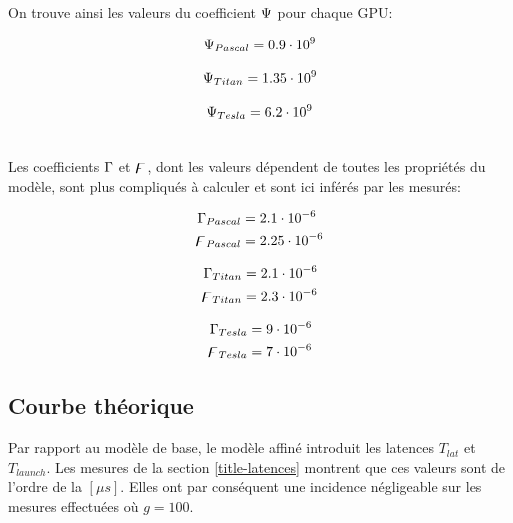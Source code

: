 \noindent On trouve ainsi les valeurs du coefficient $\Psi$ pour chaque \acs{GPU}:\\

\noindent\begin{minipage}{.33\linewidth}
	\begin{equation*}
	\Psi_{Pascal} = 0.9 \cdot 10^9
	\end{equation*}
\end{minipage}%
\begin{minipage}{.33\linewidth}
	\begin{equation*}
	\Psi_{Titan} = 1.35 \cdot 10^9
	\end{equation*}
\end{minipage}
\begin{minipage}{.33\linewidth}
	\begin{equation*}
	\Psi_{Tesla}  = 6.2 \cdot 10^9
	\end{equation*}
\end{minipage}\\[\baselineskip]

\noindent Les coefficients $\Gamma $ et $\digamma $, dont les valeurs dépendent de toutes les propriétés du modèle, sont plus compliqués à calculer et sont ici inférés par les mesurés: 

\noindent\begin{minipage}{.33\linewidth}
\begin{align*}
\Gamma_{Pascal} &= 2.1\cdot 10^{-6}\\
\digamma_{Pascal} &= 2.25\cdot 10^{-6}\\
\end{align*}
\end{minipage}%
\begin{minipage}{.33\linewidth}
\begin{align*}
\Gamma_{Titan} &= 2.1\cdot 10^{-6}\\
\digamma_{Titan} &= 2.3\cdot 10^{-6}\\
\end{align*}
\end{minipage}%
\begin{minipage}{.33\linewidth}
\begin{align*}
\Gamma_{Tesla} &= 9\cdot 10^{-6}\\
\digamma_{Tesla} &= 7\cdot 10^{-6}\\
\end{align*}
\end{minipage}

\subsection{Courbe théorique}
Par rapport au modèle de base, le modèle affiné introduit les latences $T_{lat}$ et $T_{launch}$. Les mesures de la section \ref{title-latences} montrent que ces valeurs sont de l'ordre de la $[\mu s]$. Elles ont par conséquent une incidence négligeable sur les mesures effectuées où $g=100$.

